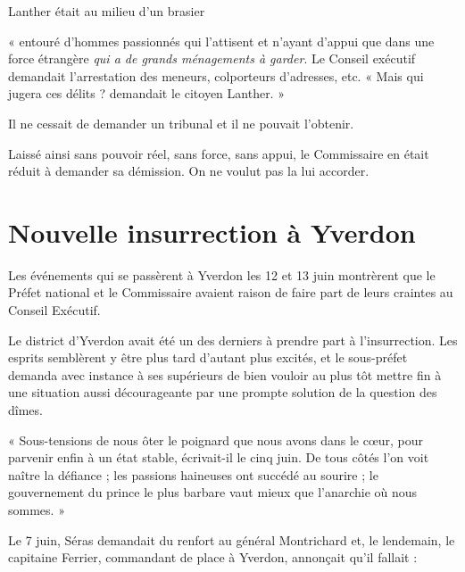 \documentclass[french,twoside]{book} %
\newenvironment{quoteblock}%
  {\begin{quoting}}
  {\end{quoting}}
\newenvironment{quotebar}{%
    \def\FrameCommand{{\color{rubric!10!}\vrule width 0.5em} \hspace{0.9em}}%
    \def\OuterFrameSep{\itemsep} %
    \MakeFramed {\advance\hsize-\width \FrameRestore}
  }%
  {%
    \endMakeFramed
  }
\renewenvironment{quoteblock}%
  {%
    \savenotes
    \setstretch{0.9}
    \begin{quotebar}
  }
  {%
    \end{quotebar}
    \spewnotes
  }
\begin{document}
\noindent Lanther était au milieu d’un brasier\par

\begin{quoteblock}
\noindent « entouré d’hommes passionnés qui l’attisent et n’ayant d’appui que dans une force étrangère \emph{qui a de grands ménagements à garder}. Le Conseil exécutif demandait l’arrestation des meneurs, colporteurs d’adresses, etc. « Mais qui jugera ces délits ? demandait le citoyen Lanther. »\end{quoteblock}

\noindent Il ne cessait de demander un tribunal et il ne pouvait l’obtenir.\par
Laissé ainsi sans pouvoir réel, sans force, sans appui, le Commissaire en était réduit à demander sa démission. On ne voulut pas la lui accorder.
\section[Nouvelle insurrection à Yverdon]{Nouvelle insurrection à Yverdon}
\noindent Les événements qui se passèrent à Yverdon les 12 et 13 juin montrèrent que le Préfet national et le Commissaire avaient raison de faire part de leurs craintes au Conseil Exécutif.\par
Le district d’Yverdon avait été un des derniers à prendre part à l’insurrection. Les esprits semblèrent y être plus tard d’autant plus excités, et le sous-préfet demanda avec instance à ses supérieurs de bien vouloir au plus tôt mettre fin à une situation aussi décourageante par une prompte solution de la question des dîmes.\par

\begin{quoteblock}
 \noindent  « Sous-tensions de nous ôter le poignard que nous avons dans le cœur, pour parvenir enfin à un état stable, écrivait-il le cinq juin. De tous côtés l’on voit naître la défiance ; les passions haineuses ont succédé au sourire ; le gouvernement du prince le plus barbare vaut mieux que l’anarchie où nous sommes. »
 \end{quoteblock}

\noindent Le 7 juin, Séras demandait du renfort au général Montrichard et, le lendemain, le capitaine Ferrier, commandant de place à Yverdon, annonçait qu’il fallait :\par
\end{document}
